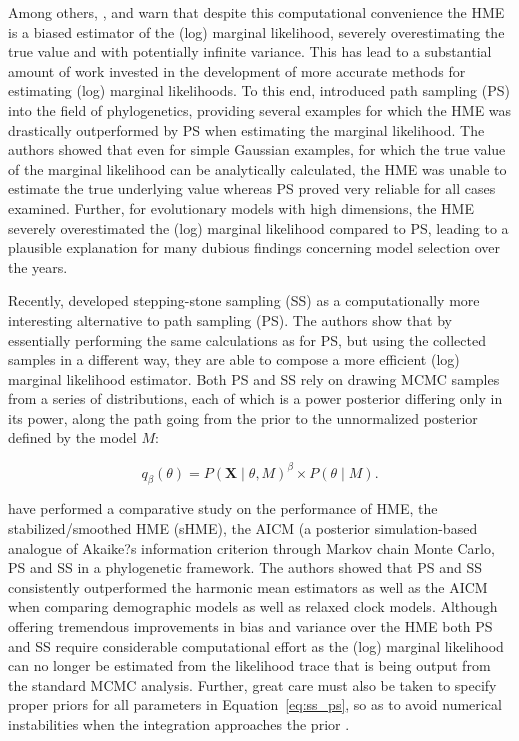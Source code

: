 Among others, \cite{Meng1996}, \cite{Lartillot2006} and \cite{Xie2011} warn that despite this computational convenience the HME is a biased estimator of the (log) marginal likelihood, severely overestimating the true value and with potentially infinite variance.
This has lead to a substantial amount of work invested in the development of more accurate methods for estimating (log) marginal likelihoods.
To this end, \cite{Lartillot2006} introduced path sampling (PS) into the field of phylogenetics, providing several examples for which the HME was drastically outperformed by PS when estimating the marginal likelihood.
The authors showed that even for simple Gaussian examples, for which the true value of the marginal likelihood can be analytically calculated, the HME was unable to estimate the true underlying value whereas PS proved very reliable for all cases examined. 
Further, for evolutionary models with high dimensions, the HME severely overestimated the (log) marginal likelihood compared to PS, leading to a plausible explanation for many dubious findings concerning model selection over the years.

Recently, \cite{Xie2011} developed stepping-stone sampling (SS) as a computationally more interesting alternative to path sampling (PS).
The authors show that by essentially performing the same calculations as for PS, but using the collected samples in a different way, they are able to compose a more efficient (log) marginal likelihood estimator.
Both PS and SS rely on drawing MCMC samples from a series of distributions, each of which is a power posterior differing only in its power, along the path going from the prior to the unnormalized posterior defined by the model $M$:  

\begin{equation}  
q_{\beta}\left(\theta\right)=P\left(\mathbf{X}\mid\theta,M\right)^{\beta} \times P\left(\theta\mid M\right).
\label{eq:ss_ps}
\end{equation}  

\cite{Baele2012} have performed a comparative study on the performance of HME, the stabilized/smoothed HME (sHME), the AICM (a posterior simulation-based analogue of Akaike?s information criterion through Markov chain Monte Carlo, PS and SS in a phylogenetic framework.
The authors showed that PS and SS consistently outperformed the harmonic mean estimators as well as the AICM when comparing demographic models as well as relaxed clock models.
Although offering tremendous improvements in bias and variance over the HME both PS and SS require considerable computational effort as the (log) marginal likelihood can no longer be estimated from the likelihood trace that is being output from the standard MCMC analysis. 
Further, great care must also be taken to specify proper priors for all parameters in Equation~\ref{eq:ss_ps}, so as to avoid numerical instabilities when the integration approaches the prior \cite{Baele2013b}.  











